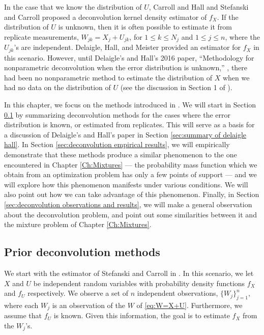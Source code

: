 	In the case that we know the distribution of $U$, Carroll and Hall \cite{Carroll1988-aj} and Stefanski and Carroll \cite{Stefanski1990-uo} proposed a deconvolution kernel density estimator of $f_X$. If the distribution of $U$ is unknown, then it is often possible to estimate it from replicate measurements, $W_{jk} = X_j + U_{jk}$, for $1 \leq k \leq N_j$ and $1 \leq j \leq n$, where the $U_{jk}$'s are independent. Delaigle, Hall, and Meister provided an estimator for $f_X$ in this scenario. However, until Delaigle's and Hall's 2016 paper, ``Methodology for nonparametric deconvolution when the error distribution is unknown,'' \cite{Delaigle2016-la}, there had been no nonparametric method to estimate the distribution of $X$ when we had no data on the distribution of $U$ (see the discussion in Section 1 of \cite{Delaigle2016-la}).


	In this chapter, we focus on the methods introduced in \cite{Delaigle2016-la}. We will start in Section \ref{sec:summary of basic deconvolution} by summarizing deconvolution methods for the cases where the error distribution is known, or estimated from replicates. This will serve as a basis for a discussion of Delaigle's and Hall's \cite{Delaigle2016-la} paper in Section \ref{sec:summary of delaigle hall}. In Section \ref{sec:deconvolution empirical results}, we will empirically demonstrate that these methods produce a similar phenomenon to the one encountered in Chapter \ref{Ch:Mixtures} --- the probability mass function which we obtain from an optimization problem has only a few points of support ---  and we will explore how this phenomenon manifests under various conditions. We will also point out how we can take advantage of this phenomenon. 
	Finally, in Section \ref{sec:deconvolution observations and results}, we will make a general observation about the deconvolution problem, and point out some similarities between it and the mixture problem of Chapter \ref{Ch:Mixtures}.


\subsection{Prior deconvolution methods}
\label{sec:summary of basic deconvolution}
	We start with the estimator of Stefanski and Carroll in \cite{Stefanski1990-uo}. In this scenario, we let $X$ and $U$ be independent random variables with probability density functions $f_X$ and $f_U$ respectively. We observe a set of $n$ independent observations, $\{W_j\}_{j = 1}^n$, where each $W_j$ is an observation of the $W$ of \eqref{eq:W=X+U}.
	Furthermore, we assume that $f_U$ is known. Given this information, the goal is to estimate $f_X$ from the $W_j$'s.

